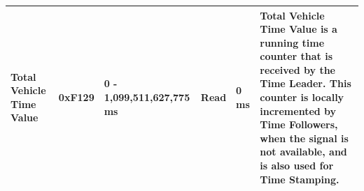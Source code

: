 \begin{longtable}{|l|l|l|l|l|l|}
\hline\hline
\endhead
\hline
\endfoot
\hline
\endlastfoot
\begin{minipage}{0.09\linewidth}\raggedright\vspace{.75ex}Total Vehicle Time Value\vspace{.75ex}\end{minipage} & \begin{minipage}{0.09\linewidth}\raggedright\vspace{.75ex}0xF129\vspace{.75ex}\end{minipage} & \begin{minipage}{0.22\linewidth}\raggedright\vspace{.75ex}0 - 1,099,511,627,775 ms\vspace{.75ex}\end{minipage} & \begin{minipage}{0.09\linewidth}\raggedright\vspace{.75ex}Read\vspace{.75ex}\end{minipage} & \begin{minipage}{0.09\linewidth}\raggedright\vspace{.75ex}0 ms\vspace{.75ex}\end{minipage} & \begin{minipage}{0.26\linewidth}\raggedright\vspace{.75ex}Total Vehicle Time Value is a running time counter that is received by the Time Leader. This counter is locally incremented by Time Followers, when the signal is not available, and is also used for Time Stamping.\vspace{.75ex}\end{minipage}\\\hline
\end{longtable}